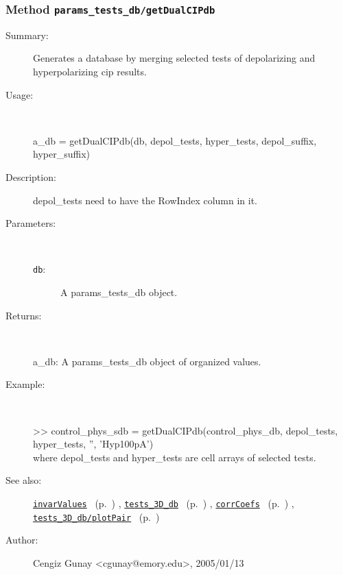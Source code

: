 \subsubsection[Method \texttt{getDualCIPdb}]{Method \texttt{params\_tests\_db/getDualCIPdb}}%
%
\label{ref_params_tests_db__getDualCIPdb}%
\hypertarget{ref_params_tests_db__getDualCIPdb}{}%
\begin{description}
\item[Summary:]Generates a database by merging selected tests of depolarizing and hyperpolarizing cip results.
%
\item[Usage:]~%
\begin{lyxcode}%
a\_db = getDualCIPdb(db, depol\_tests, hyper\_tests, depol\_suffix, hyper\_suffix)
%
\end{lyxcode}%
%
\item[Description:]%
depol\_tests need to have the RowIndex column in it.
\item[Parameters:]~
\begin{description}%
\item[\texttt{db}:]
 A params\_tests\_db object.
\end{description}%
%
\item[Returns:
]~

	a\_db: A params\_tests\_db object of organized values.
%
\item[Example:]~
\begin{lyxcode}        >> control\_phys\_sdb = getDualCIPdb(control\_phys\_db, depol\_tests, hyper\_tests, '', 'Hyp100pA')
\\%
        where depol\_tests and hyper\_tests are cell arrays of selected tests.
\\%
\end{lyxcode}
%
\item[See also:]%
\hyperlink{ref_invarValues}{\texttt{invarValues}}%
\ (p.~\pageref{ref_invarValues})%
%
, \hyperlink{ref_tests_3D_db}{\texttt{tests\_3D\_db}}%
\ (p.~\pageref{ref_tests_3D_db})%
%
, \hyperlink{ref_corrCoefs}{\texttt{corrCoefs}}%
\ (p.~\pageref{ref_corrCoefs})%
%
, \hyperlink{ref_tests_3D_db__plotPair}{\texttt{tests\_3D\_db/plotPair}}%
\ (p.~\pageref{ref_tests_3D_db__plotPair})%
%
%
\item[Author:]%
Cengiz Gunay <cgunay@emory.edu>, 2005/01/13
%
\end{description}
\methodline%
